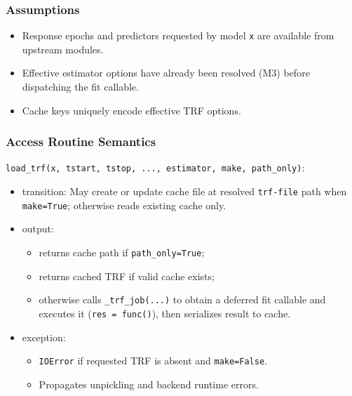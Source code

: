 \documentclass[12pt, titlepage]{article}
\begin{document}
\subsubsection{Assumptions}

\begin{itemize}
\item Response epochs and predictors requested by model \texttt{x} are available
from upstream modules.
\item Effective estimator options have already been resolved (M3) before
dispatching the fit callable.
\item Cache keys uniquely encode effective TRF options.
\end{itemize}

\subsubsection{Access Routine Semantics}

\noindent \texttt{load\_trf(x, tstart, tstop, ..., estimator, make, path\_only)}:
\begin{itemize}
\item transition: May create or update cache file at resolved \texttt{trf-file}
path when \texttt{make=True}; otherwise reads existing cache only.
\item output:
\begin{itemize}
\item returns cache path if \texttt{path\_only=True};
\item returns cached TRF if valid cache exists;
\item otherwise calls \texttt{\_trf\_job(...)} to obtain a deferred fit callable
and executes it (\texttt{res = func()}), then serializes result to cache.
\end{itemize}
\item exception:
\begin{itemize}
\item \texttt{IOError} if requested TRF is absent and \texttt{make=False}.
\item Propagates unpickling and backend runtime errors.
\end{itemize}
\end{itemize}
\end{document}
